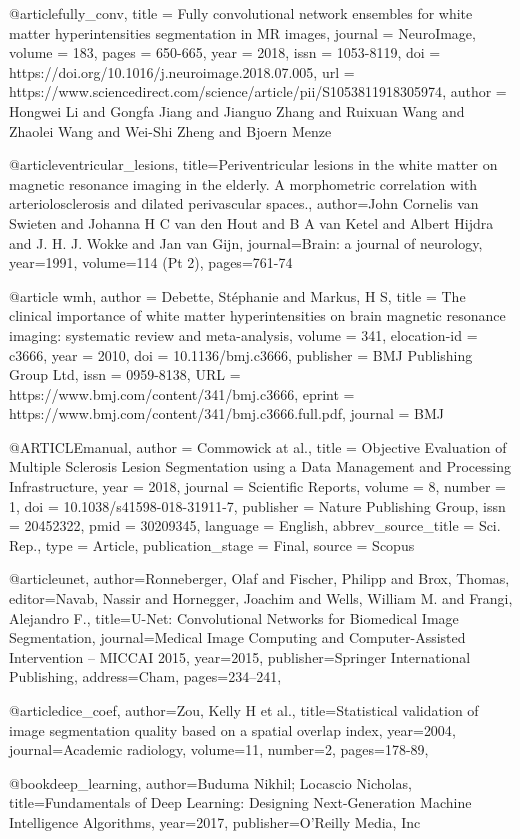 @article{fully_conv,
title = {Fully convolutional network ensembles for white matter hyperintensities segmentation in MR images},
journal = {NeuroImage},
volume = {183},
pages = {650-665},
year = {2018},
issn = {1053-8119},
doi = {https://doi.org/10.1016/j.neuroimage.2018.07.005},
url = {https://www.sciencedirect.com/science/article/pii/S1053811918305974},
author = {Hongwei Li and Gongfa Jiang and Jianguo Zhang and Ruixuan Wang and Zhaolei Wang and Wei-Shi Zheng and Bjoern Menze}
}

@article{ventricular_lesions,
  title={Periventricular lesions in the white matter on magnetic resonance imaging in the elderly. A morphometric correlation with arteriolosclerosis and dilated perivascular spaces.},
  author={John Cornelis van Swieten and Johanna H C van den Hout and B A van Ketel and Albert Hijdra and J. H. J. Wokke and Jan van Gijn},
  journal={Brain: a journal of neurology},
  year={1991},
  volume={114 (Pt 2)},
  pages={761-74}
}

@article {wmh,
	author = {Debette, St{\'e}phanie and Markus, H S},
	title = {The clinical importance of white matter hyperintensities on brain magnetic resonance imaging: systematic review and meta-analysis},
	volume = {341},
	elocation-id = {c3666},
	year = {2010},
	doi = {10.1136/bmj.c3666},
	publisher = {BMJ Publishing Group Ltd},
	issn = {0959-8138},
	URL = {https://www.bmj.com/content/341/bmj.c3666},
	eprint = {https://www.bmj.com/content/341/bmj.c3666.full.pdf},
	journal = {BMJ}
}

@ARTICLE{manual,
	author = {Commowick at al.},
	title = {Objective Evaluation of Multiple Sclerosis Lesion Segmentation using a Data Management and Processing Infrastructure},
	year = {2018},
	journal = {Scientific Reports},
	volume = {8},
	number = {1},
	doi = {10.1038/s41598-018-31911-7},
	publisher = {Nature Publishing Group},
	issn = {20452322},
	pmid = {30209345},
	language = {English},
	abbrev_source_title = {Sci. Rep.},
	type = {Article},
	publication_stage = {Final},
	source = {Scopus}
}

@article{unet,
author={Ronneberger, Olaf
and Fischer, Philipp
and Brox, Thomas},
editor={Navab, Nassir
and Hornegger, Joachim
and Wells, William M.
and Frangi, Alejandro F.},
title={U-Net: Convolutional Networks for Biomedical Image Segmentation},
journal={Medical Image Computing and Computer-Assisted Intervention -- MICCAI 2015},
year={2015},
publisher={Springer International Publishing},
address={Cham},
pages={234--241},
}

@article{dice_coef, 
author={Zou, Kelly H et al.},
title={Statistical validation of image segmentation quality based on a spatial overlap index}, 
year={2004}, 
journal={Academic radiology},
volume={11},
number={2},
pages={178-89},
}

@book{deep_learning,
author={Buduma Nikhil; Locascio Nicholas},
title={Fundamentals of Deep Learning: Designing Next-Generation Machine Intelligence Algorithms},
year={2017},
publisher={O’Reilly Media, Inc}
}
